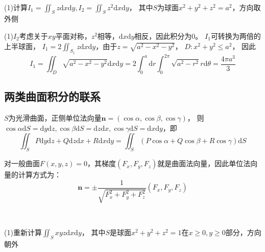 ~

\begin{exercise}[基本计算]
  (1)计算$I_1 = \iint_S z \mathrm{d} x \mathrm{d} y, I_2 = \iint_S z^2 \mathrm{d} x \mathrm{d} y$，
  其中$S$为球面$x^2 + y^2 + z^2 = a^2$，方向取外侧
\end{exercise}

\begin{solution}
  (1)$I_2$考虑关于$xy$平面对称，$z^2$相等，$\mathrm{d} x\mathrm{d} y$相反，因此积分为$0$。
  $I_1$可转换为两倍的上半球面，
  $I_1 = 2\iint_{S_1}z \mathrm{d} x \mathrm{d} y$，由于$z = \sqrt{a^2 - x^2 - y^2}$，
  $D:x^2 + y^2 \leq a^2$，
  因此
  \begin{equation*}
    I_1 = \iint_D \sqrt{a^2 - x^2 - y^2}\mathrm{d} x \mathrm{d} y = 2 \int_0^a \mathrm{d} r \int_0^{2\pi} \sqrt{a^2 - r^2}r\mathrm{d} \theta = \frac{4\pi a^3}{3}
  \end{equation*}
\end{solution}


\subsection{两类曲面积分的联系}

\begin{theorem}[两类曲面积分的联系]
  $S$为光滑曲面，正侧单位法向量$\mathbf{n} = (\cos \alpha, \cos \beta, \cos \gamma)$，
  则$\cos \alpha \mathrm{d} S = \mathrm{d} y \mathrm{d} z, \cos \beta \mathrm{d} S = \mathrm{d} z \mathrm{d} x, \cos \gamma \mathrm{d} S = \mathrm{d} x \mathrm{d} y$，即
  \begin{equation*}
    \iint_S P\mathrm{d}y \mathrm{d} z + Q\mathrm{d} z \mathrm{d} x + R\mathrm{d} x \mathrm{d} y = \iint_S (P\cos \alpha + Q \cos \beta + R \cos \gamma)\mathrm{d}S
  \end{equation*}
\end{theorem}

\begin{note}
  对一般曲面$F(x,y,z) = 0$，其梯度$(F_x,F_y,F_z)$就是曲面法向量，因此单位法向量的计算方式为：
  \begin{equation*}
    \mathbf{n} = \pm \frac{1}{\sqrt{F_x^2 + F_y^2 + F_z^2}}(F_x,F_y,F_z)
  \end{equation*}
\end{note}

~

\begin{exercise}[重新计算第二型曲面积分]
  (1)重新计算$\iint_S xyz \mathrm{d} x \mathrm{d} y$，
  其中$S$是球面$x^2 + y^2 + z^2 = 1$在$x \geq 0, y \geq 0$部分，方向朝外
\end{exercise}

